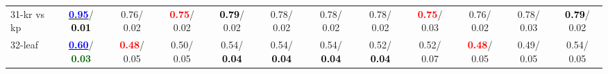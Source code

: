 \begin{table}[h]
\begin{center}
{\begin{tabular}{lc|c|c|c|c|c|c|c|c|c|c}
31-kr vs kp & \underline{\textcolor{blue}{\textbf{  0.95}}}/\textcolor{black}{\textbf{  0.01}} &   0.76/  0.02 & \textcolor{red}{\textbf{  0.75}}/  0.02 & \textcolor{black}{\textbf{  0.79}}/  0.02 &   0.78/  0.02 &   0.78/  0.02 &   0.78/  0.02 & \textcolor{red}{\textbf{  0.75}}/  0.03 &   0.76/  0.02 &   0.78/  0.03 & \textcolor{black}{\textbf{  0.79}}/  0.02 \\
32-leaf & \underline{\textcolor{blue}{\textbf{  0.60}}}/\textcolor{darkgreen}{\textbf{  0.03}} & \textcolor{red}{\textbf{  0.48}}/  0.05 &   0.50/  0.05 &   0.54/\textcolor{black}{\textbf{  0.04}} &   0.54/\textcolor{black}{\textbf{  0.04}} &   0.54/\textcolor{black}{\textbf{  0.04}} &   0.52/\textcolor{black}{\textbf{  0.04}} &   0.52/  0.07 & \textcolor{red}{\textbf{  0.48}}/  0.05 &   0.49/  0.05 &   0.54/  0.05 \\\end{tabular}}\label{stratsBalAcc0a5NN}
\end{center}
\end{table}
